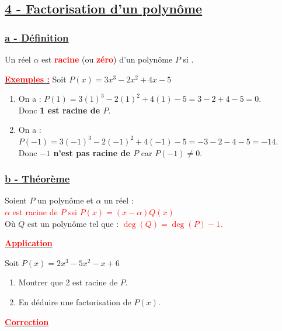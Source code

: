 \documentclass[12pt,a4paper]{article}
\begin{document}
\subsection*{%
    \color{red} \underline{4 - Factorisation d'un polynôme}%
}

\subsubsection*{%
    \color{red} \underline{a - Définition}%
}

Un réel $\alpha$ est \textbf{\textcolor{red}{racine}} (ou \textbf{\textcolor{red}{zéro}}) d'un polynôme $P$ si \fbox{\textcolor{red}{$P(\alpha) = 0$}}.

\textbf{\underline{\textcolor{red}{Exemples :}}} Soit $P(x) = 3x^3 - 2x^2 + 4x - 5$
\begin{enumerate}
    \item On a : $P(1) = 3(1)^3 - 2(1)^2 + 4(1) - 5 = 3 - 2 + 4 - 5 = 0$. \\
    Donc \textbf{1 est racine de $P$}.
    \item On a : $P(-1) = 3(-1)^3 - 2(-1)^2 + 4(-1) - 5 = -3 - 2 - 4 - 5 = -14$. \\
    Donc \textbf{$-1$ n'est pas racine de $P$} car $P(-1) \neq 0$.
\end{enumerate}

\subsubsection*{%
    \color{red} \underline{b - Théorème}%
}

Soient $P$ un polynôme et $\alpha$ un réel : \\
\textcolor{red}{$\alpha$ est racine de $P$ ssi $P(x) = (x - \alpha) Q(x)$} \\
Où $Q$ est un polynôme tel que : \textcolor{red}{$\deg(Q) = \deg(P) - 1$}.

\begin{center}
    \textbf{\underline{\textcolor{red}{Application}}}
\end{center}

Soit $P(x) = 2x^3 - 5x^2 - x + 6$
\begin{enumerate}
    \item Montrer que 2 est racine de $P$.
    \item En déduire une factorisation de $P(x)$.
\end{enumerate}

\begin{center}
    \textbf{\underline{\textcolor{red}{Correction}}}
\end{center}
\end{document}
